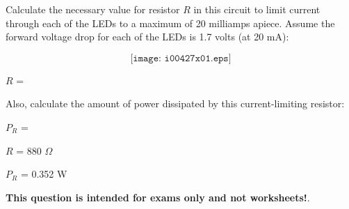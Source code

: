 

Calculate the necessary value for resistor $R$ in this circuit to limit current through each of the LEDs to a maximum of 20 milliamps apiece.  Assume the forward voltage drop for each of the LEDs is 1.7 volts (at 20 mA):

$$\texttt{[image: i00427x01.eps]}$$

$R$ = 

\vskip 10pt

Also, calculate the amount of power dissipated by this current-limiting resistor:

\vskip 10pt

$P_R$ = 

\vskip 10pt







$R$ = 880 $\Omega$

\vskip 10pt

$P_R$ = 0.352 W







{\bf This question is intended for exams only and not worksheets!}.


